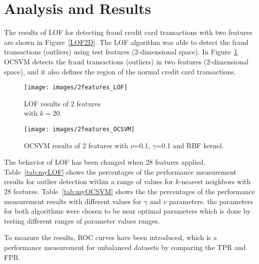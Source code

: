 \section{Analysis and Results}
The results of LOF for detecting fraud credit card transactions with two features are shown in Figure~\ref{LOF2D}. The LOF algorithm was able to detect the fraud transactions (outliers) using test features (2-dimensional space). In Figure~\ref{OCSVM2D} OCSVM detects the fraud transactions (outliers) in two features (2-dimensional space), and it also defines the region of the normal credit card transactions.
\begin{figure}[H]
\centering
{}
  \texttt{[image: images/2features\_LOF]}
  \caption{LOF results of 2 features\\with $k=20$.}
  \label{LOF2D}
\endminipage\hspace{0.7cm}
  \texttt{[image: images/2features\_OCSVM]}
    \caption{OCSVM results of 2 features with $\nu$=0.1, $\gamma$=0.1 and RBF kernel.}
      \label{OCSVM2D}
\endminipage
\end{figure}
The behavior of LOF has been changed when 28 features applied. Table~\ref{tab:myLOF} shows the percentages of the performance measurement results for outlier detection within a range of values for $k$-nearest neighbors with 28 features. Table~\ref{tab:myOCSVM} shows the the percentages of the performance measurement results with different values for $\gamma$ and $\nu$ parameters. the parameters for both algorithms were chosen to be near optimal parameters which is done by testing different ranges of parameter values ranges.

To measure the results, ROC curves have been introduced, which is a performance measurement for unbalanced datasets by comparing the TPR and FPR.

